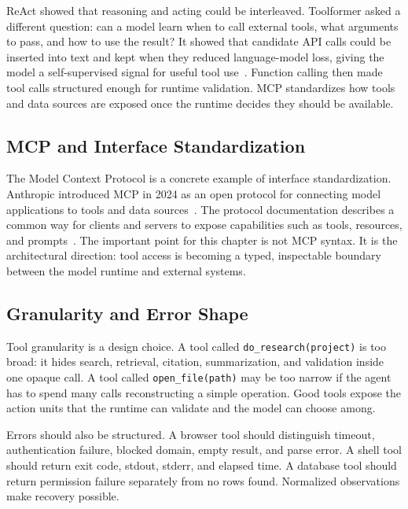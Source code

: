\begin{tcolorbox}[colback=blue!3, colframe=blue!45, title=\textbf{Toolformer and the Question of Tool Selection}]
ReAct showed that reasoning and acting could be interleaved. Toolformer asked a different question: can a model learn when to call external tools, what arguments to pass, and how to use the result? It showed that candidate API calls could be inserted into text and kept when they reduced language-model loss, giving the model a self-supervised signal for useful tool use~\cite{schick2023toolformer}. Function calling then made tool calls structured enough for runtime validation. MCP standardizes how tools and data sources are exposed once the runtime decides they should be available.
\end{tcolorbox}

\subsection{MCP and Interface Standardization}

The Model Context Protocol is a concrete example of interface standardization. Anthropic introduced MCP in 2024 as an open protocol for connecting model applications to tools and data sources~\cite{anthropic2024mcp}. The protocol documentation describes a common way for clients and servers to expose capabilities such as tools, resources, and prompts~\cite{mcp2026spec}. The important point for this chapter is not MCP syntax. It is the architectural direction: tool access is becoming a typed, inspectable boundary between the model runtime and external systems.

\subsection{Granularity and Error Shape}

Tool granularity is a design choice. A tool called \texttt{do\_research(project)} is too broad: it hides search, retrieval, citation, summarization, and validation inside one opaque call. A tool called \texttt{open\_file(path)} may be too narrow if the agent has to spend many calls reconstructing a simple operation. Good tools expose the action units that the runtime can validate and the model can choose among.

Errors should also be structured. A browser tool should distinguish timeout, authentication failure, blocked domain, empty result, and parse error. A shell tool should return exit code, stdout, stderr, and elapsed time. A database tool should return permission failure separately from no rows found. Normalized observations make recovery possible.

